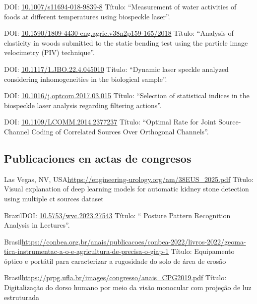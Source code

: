 \documentclass[11pt,a4paper,sans]{moderncv} %
\newcommand{\doiurl}[1]{\href{https://doi.org/#1}{#1}}
\begin{document}
	      {DOI: \doiurl{10.1007/s11694-018-9839-8}}{}{}
	      {Título: ``Measurement of water activities of foods at different temperatures using biospeckle laser''.}

	      {DOI: \doiurl{10.1590/1809-4430-eng.agric.v38n2p159-165/2018}}{}{}
	      {Título: ``Analysis of elasticity in woods submitted to the static bending test using the particle image velocimetry (PIV) technique''.}

	      {DOI: \doiurl{10.1117/1.JBO.22.4.045010}}{}{}
	      {Título: ``Dynamic laser speckle analyzed considering inhomogeneities in the biological sample''.}
	      
	      {DOI: \doiurl{10.1016/j.optcom.2017.03.015}}{}{}
	      {Título: ``Selection of statistical indices in the biospeckle laser analysis regarding filtering actions''.}
	      
	      {DOI: \doiurl{10.1109/LCOMM.2014.2377237}}{}{}
	      {Título: ``Optimal  Rate for Joint Source-Channel Coding of Correlated Sources Over Orthogonal Channels''.}

\subsection{Publicaciones en actas de congresos}

	      {Las Vegas, NV, USA}{}{\url{https://engineering-urology.org/am/38EUS_2025.pdf}}
	      {Título: Visual explanation of deep learning models for automatic
kidney stone detection using multiple ct sources dataset}

	      {Brazil}{}{DOI: \doiurl{10.5753/wvc.2023.27543} }
	      {Título: `` Posture Pattern Recognition Analysis in Lectures''.}
	      
	      {Brasil}{}{\url{https://conbea.org.br/anais/publicacoes/conbea-2022/livros-2022/geoma-tica-instrumentac-a-o-e-agricultura-de-precisa-o-giap-1}}
	      {Título: Equipamento óptico e portátil para caracterizar a rugosidade do solo de área de erosão}

	      {Brasil}{}{\url{https://prpg.ufla.br/images/congresso/anais_CPG2019.pdf}}
	      {Título: Digitalização do dorso humano por meio da visão monocular com projeção de luz estruturada}
\end{document}

